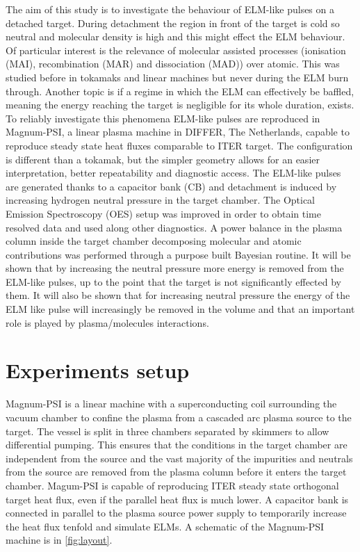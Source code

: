 The aim of this study is to investigate the behaviour of ELM-like pulses on a detached target. During detachment the region in front of the target is cold so neutral and molecular density is high and this might effect the ELM behaviour. Of particular interest is the relevance of molecular assisted processes (ionisation (MAI), recombination (MAR) and dissociation (MAD)) over atomic. This was studied before in tokamaks and linear machines but never during the ELM burn through. \cite{Akkermans2020,Verhaegh2021a} Another topic is if a regime in which the ELM can effectively be baffled, meaning the energy reaching the target is negligible for its whole duration, exists.
To reliably investigate this phenomena ELM-like pulses are reproduced in Magnum-PSI, a linear plasma machine in DIFFER, The Netherlands, capable to reproduce steady state heat fluxes comparable to ITER target. The configuration is different than a tokamak, but the simpler geometry allows for an easier interpretation, better repeatability and diagnostic access. The ELM-like pulses are generated thanks to a capacitor bank (CB) and detachment is induced by increasing hydrogen neutral pressure in the target chamber.
The Optical Emission Spectroscopy (OES) setup was improved in order to obtain time resolved data and used along other diagnostics. A power balance in the plasma column inside the target chamber decomposing molecular and atomic contributions was performed through a purpose built Bayesian routine.
It will be shown that by increasing the neutral pressure more energy is removed from the ELM-like pulses, up to the point that the target is not significantly effected by them. It will also be shown that for increasing neutral pressure the energy of the ELM like pulse will increasingly be removed in the volume and that an important role is played by plasma/molecules interactions.

\section{Experiments setup}\label{Experiments setup}

Magnum-PSI is a linear machine with a superconducting coil surrounding the vacuum chamber to confine the plasma from a cascaded arc plasma source to the target. The vessel is split in three chambers separated by skimmers to allow differential pumping. This ensures that the conditions in the target chamber are independent from the source and the vast majority of the impurities and neutrals from the source are removed from the plasma column before it enters the target chamber. \cite{Scholten2013} Magum-PSI is capable of reproducing ITER steady state orthogonal target heat flux, even if the parallel heat flux is much lower. \cite{Scholten2013} A capacitor bank is connected in parallel to the plasma source power supply to temporarily increase the heat flux tenfold and simulate ELMs. \cite{Morgan2014} A schematic of the Magnum-PSI machine is in \autoref{fig:layout}.

